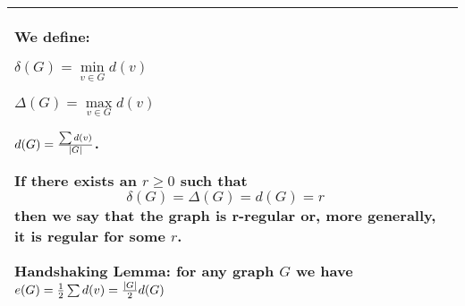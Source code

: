 \begin{tabularx}{\textwidth}{ X!{\color{git90gray}\vrule} X}
    We define:\smallskip
    
     $\delta(G)=\min\limits_{v\in G}d(v)$
    \smallskip

     $\Delta(G)=\max\limits_{v\in G}d(v)$
    \smallskip

     $d(G)={\sum d(v)\over |G|}$.
    \medskip

    If there exists an $r\geq 0$ such that
    $$\delta(G)=\Delta(G)=d(G)=r$$
    then we say that the graph is {\color{def}r-regular} or, more generally, it is {\color{acc}regular} for some $r$.
    \medskip


    \label{handshaking-lemma}
    {\color{def}Handshaking Lemma}: for any graph $G$ we have $e(G)=\frac12\sum d(v)={|G|\over2}d(G)$

    & \\

    \hline
\end{tabularx}



